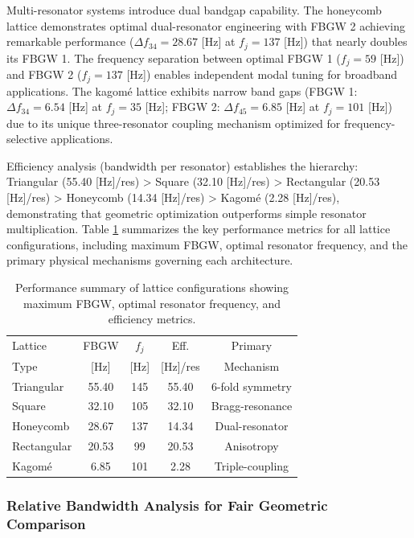 \documentclass[review,numbers,sort&compress]{elsarticle}
\begin{document}
Multi-resonator systems introduce dual bandgap capability. The honeycomb lattice demonstrates optimal dual-resonator engineering with FBGW 2 achieving remarkable performance ($\Delta f_{34} = 28.67$ [Hz] at $f_j = 137$ [Hz]) that nearly doubles its FBGW 1. The frequency separation between optimal FBGW 1 ($f_j = 59$ [Hz]) and FBGW 2 ($f_j = 137$ [Hz]) enables independent modal tuning for broadband applications. The kagomé lattice exhibits narrow band gaps (FBGW 1: $\Delta f_{34} = 6.54$ [Hz] at $f_j = 35$ [Hz]; FBGW 2: $\Delta f_{45} = 6.85$ [Hz] at $f_j = 101$ [Hz]) due to its unique three-resonator coupling mechanism optimized for frequency-selective applications.

Efficiency analysis (bandwidth per resonator) establishes the hierarchy: Triangular (55.40 [Hz]/res) > Square (32.10 [Hz]/res) > Rectangular (20.53 [Hz]/res) > Honeycomb (14.34 [Hz]/res) > Kagomé (2.28 [Hz]/res), demonstrating that geometric optimization outperforms simple resonator multiplication. Table \ref{tab:performance_summary} summarizes the key performance metrics for all lattice configurations, including maximum FBGW, optimal resonator frequency, and the primary physical mechanisms governing each architecture.

\begin{table}[htb]
\small
\centering
\caption{Performance summary of lattice configurations showing maximum FBGW, optimal resonator frequency, and efficiency metrics.}
\label{tab:performance_summary}
\begin{tabular}{lcccc}
\hline
Lattice & FBGW & $f_j$ & Eff. & Primary \\
Type & [Hz] & [Hz] & [Hz]/res & Mechanism \\
\hline
Triangular & 55.40 & 145 & 55.40 & 6-fold symmetry \\
Square & 32.10 & 105 & 32.10 & Bragg-resonance \\
Honeycomb & 28.67 & 137 & 14.34 & Dual-resonator \\
Rectangular & 20.53 & 99 & 20.53 & Anisotropy \\
Kagomé & 6.85 & 101 & 2.28 & Triple-coupling \\
\hline
\end{tabular}
\end{table}

\subsubsection*{Relative Bandwidth Analysis for Fair Geometric Comparison}
\end{document}

